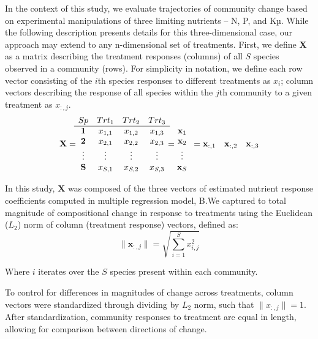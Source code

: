 \documentclass[twoside,12pt,final]{ucthesis-CA2012}
\begin{document}
\begin{ucmainmatter}
In the context of this study, we evaluate trajectories of community change based on experimental manipulations of three limiting nutrients -- N, P, and Kµ. While the following description presents details for this three-dimensional case, our approach may extend to any n-dimensional set of treatments. First, we define \(\mathbf{X}\) as a matrix describing the treatment responses (columns) of all \(S\) species observed in a community (rows). For simplicity in notation, we define each row vector consisting of the \(i\)th species responses to different treatments as \(x_i\); column vectors describing the response of all species within the \(j\)th community to a given treatment as \(x_{:,j}\).
\[
\mathbf{X} = 
\begin{matrix}
Sp & Trt_1 & Trt_2 & Trt_3\\
\hline
\mathbf{1}& x_{1,1} & x_{1,2} & x_{1,3} \\
\mathbf{2} & x_{2,1} & x_{2,2} & x_{2,3} \\
\vdots & \vdots & \vdots & \vdots \\
\mathbf{S} & x_{S,1} & x_{S,2} & x_{S,3} \\
\end{matrix} =
\begin{matrix}
\\
\mathbf{x}_1 \\
\mathbf{x}_2 \\
\vdots \\
\mathbf{x}_S \\
\end{matrix} \\
= \\
\begin{matrix}
\mathbf{x}_{:,1} & \mathbf{x}_{:,2} & \mathbf{x}_{:,3}\\
\end{matrix}
\]

In this study, \(\mathbf{X}\) was composed of the three vectors of estimated nutrient response coefficients computed in multiple regression model, B.We captured to total magnitude of compositional change in response to treatments using the Euclidean (\(L_2\)) norm of column (treatment response) vectors, defined as:
\[\|\mathbf{x}_{:,j}\| = \sqrt{\sum_{i = 1}^{S} x_{i,j}^2}\]

Where \(i\) iterates over the \(S\) species present within each community.

To control for differences in magnitudes of change across treatments, column vectors were standardized through dividing by \(L_2\) norm, such that \(\|x_{:,j}\| = 1\). After standardization, community responses to treatment are equal in length, allowing for comparison between directions of change.


\end{ucmainmatter}
\end{document}
